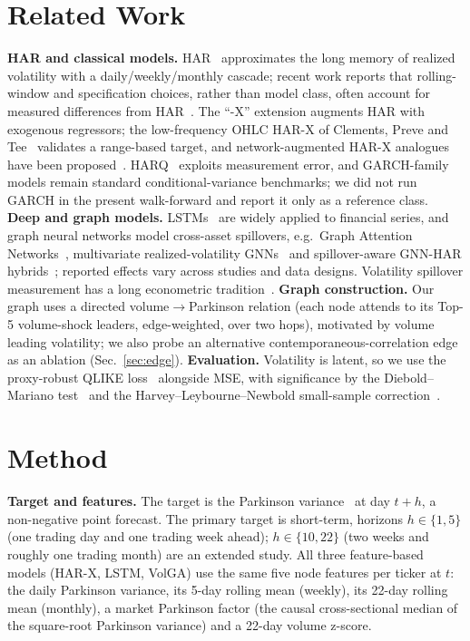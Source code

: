 \documentclass[runningheads]{llncs}
\begin{document}
\section{Related Work}
\textbf{HAR and classical models.} HAR~\cite{corsi2009} approximates the long memory of realized
volatility with a daily/weekly/monthly cascade; recent work reports that rolling-window and
specification choices, rather than model class, often account for measured differences from
HAR~\cite{audrino2025}. The ``-X'' extension augments HAR with exogenous regressors; the low-frequency
OHLC HAR-X of Clements, Preve and Tee~\cite{clements2024} validates a range-based target, and
network-augmented HAR-X analogues have been proposed~\cite{gnarharx2025}. HARQ~\cite{harq2016}
exploits measurement error, and GARCH-family models remain standard conditional-variance benchmarks;
we did not run GARCH in the present walk-forward and report it only as a reference class.
\textbf{Deep and graph models.} LSTMs~\cite{lstm1997} are widely applied to financial series, and
graph neural networks model cross-asset spillovers, e.g.\ Graph Attention Networks~\cite{gat2018},
multivariate realized-volatility GNNs~\cite{chen2022} and spillover-aware GNN-HAR
hybrids~\cite{gnnhar2025}; reported effects vary across studies and data designs. Volatility spillover
measurement has a long econometric tradition~\cite{dy2012}. \textbf{Graph construction.} Our graph
uses a directed volume$\to$Parkinson relation (each node attends to its Top-5 volume-shock leaders,
edge-weighted, over two hops), motivated by volume leading volatility; we also probe an alternative
contemporaneous-correlation edge as an ablation (Sec.~\ref{sec:edge}). \textbf{Evaluation.}
Volatility is latent, so we use the proxy-robust QLIKE loss~\cite{patton2011} alongside MSE, with
significance by the Diebold--Mariano test~\cite{dm1995} and the Harvey--Leybourne--Newbold
small-sample correction~\cite{hln1997}.

\section{Method}
\textbf{Target and features.} The target is the Parkinson variance~\cite{parkinson1980} at day
$t{+}h$, a non-negative point forecast. The primary target is short-term, horizons $h\in\{1,5\}$
(one trading day and one trading week ahead); $h\in\{10,22\}$ (two weeks and roughly one trading
month) are an extended study. All three feature-based models (HAR-X, LSTM, VolGA) use the same five
node features per ticker at $t$: the daily Parkinson variance, its 5-day rolling mean (weekly), its
22-day rolling mean (monthly), a market Parkinson factor (the causal cross-sectional median of the
square-root Parkinson variance) and a 22-day volume z-score.
\end{document}
